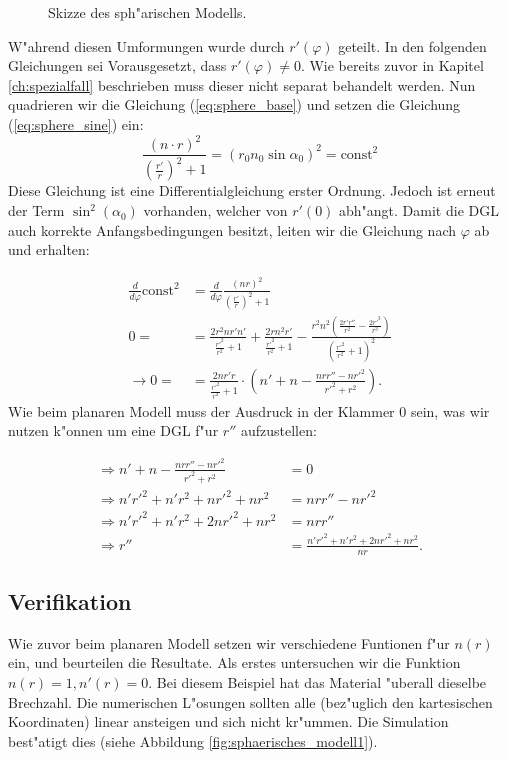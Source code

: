 \begin{refsection}
\begin{figure}
\caption{Skizze des sph"arischen Modells. \label{fig:sphere_skizze}}
\end{figure}
W"ahrend diesen Umformungen wurde durch $r'(\varphi)$ geteilt. 
In den folgenden Gleichungen sei Vorausgesetzt, dass $r'(\varphi) \neq 0$. 
Wie bereits zuvor in Kapitel \ref{ch:spezialfall} beschrieben muss dieser nicht separat behandelt werden.
Nun quadrieren wir die Gleichung (\ref{eq:sphere_base}) und setzen die Gleichung (\ref{eq:sphere_sine}) ein:
$$\frac{(n \cdot r)^2}{\displaystyle\left( \frac{r'}{r} \right)^2 +1} = (r_0 n_0 \sin \alpha_0)^2 = \text{const}^2$$
Diese Gleichung ist eine Differentialgleichung erster Ordnung. 
Jedoch ist erneut der Term $\sin^2(\alpha_0)$ vorhanden, welcher von $r'(0)$ abh"angt. 
Damit die DGL auch korrekte Anfangsbedingungen besitzt, leiten wir die Gleichung nach $\varphi$ ab und erhalten:

\begin{equation}
\begin{aligned}
\frac{d}{d\varphi} \text{const}^2 
& = \frac{d}{d\varphi}\frac{(n r)^2}{\left(\displaystyle\frac{r'}{r}\right)^2 + 1} \\
0 = 
& = \frac{2 r^2 n r' n'}{\displaystyle\frac{r'^2}{r^2}+1}+\frac{2 r n^2 r'}{\displaystyle\frac{r'^2}{r^2}+1}-\frac{r^2 n^2 \left(\displaystyle\frac{2 r' r''}{r^2}-\frac{2 r'^3}{r^3}\right)}{\left(\displaystyle\frac{r'^2}{r^2}+1\right)^2} \\
\rightarrow 0 = 
& = \frac{2n r' r}{\displaystyle\frac{r'^2}{r^2}+1} \cdot \left( n' + n - \frac{n r r'' - n r'^2}{r'^2 + r^2} \right).
\end{aligned}
\end{equation}
Wie beim planaren Modell muss der Ausdruck in der Klammer $0$ sein, was wir nutzen k"onnen um eine DGL f"ur $r''$ aufzustellen:

\begin{equation} \label{eq:sphere_allg}
\begin{aligned}
\Rightarrow n' + n - \frac{n r r'' - n r'^2}{r'^2 + r^2} 
& = 0 \\
\Rightarrow n' r'^2  + n' r^2 + n r'^2 + nr^2 
& = n r r'' - n r'^2 \\
\Rightarrow n' r'^2 + n' r^2 + 2 n r'^2 + n r^2 
& = n r r'' \\
\Rightarrow r'' 
& = \frac{n' r'^2 + n' r^2 + 2 n r'^2 + n r^2}{n r}.
\end{aligned}
\end{equation}

\subsection{Verifikation}
Wie zuvor beim planaren Modell setzen wir verschiedene Funtionen f"ur $n(r)$ ein, und beurteilen die Resultate. 
Als erstes untersuchen wir die Funktion $n(r) = 1, n'(r) = 0$. 
Bei diesem Beispiel hat das Material "uberall dieselbe Brechzahl.
Die numerischen L"osungen sollten alle (bez"uglich den kartesischen Koordinaten) linear ansteigen und sich nicht kr"ummen. Die Simulation best"atigt dies (siehe Abbildung \ref{fig:sphaerisches_modell1}).


\end{refsection}
